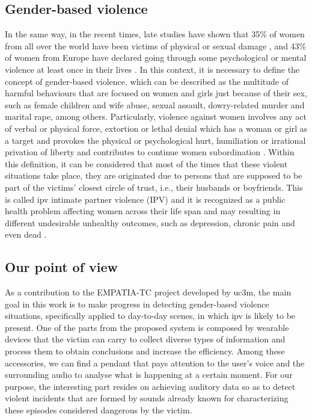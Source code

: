 \subsection{Gender-based violence}

	 In the same way, in the recent times, late studies have shown that 35\% of women from all over the world have been victims of physical or sexual damage \cite{WHO2013}, and 43\% of women from Europe have declared going through some psychological or mental violence at least once in their lives \cite{EuropeanUnionAgencyforFundamentalRights2014}. In this context, it is necessary to define the concept of gender-based violence, which can be described as the multitude of harmful behaviours that are focused on women and girls just because of their sex, such as female children and wife abuse, sexual assault, dowry-related murder and marital rape, among others. Particularly, violence against women involves any act of verbal or physical force, extortion or lethal denial which has a woman or girl as a target and provokes the physical or psychological hurt, humiliation or irrational privation of liberty and contributes to continue women subordination \cite{Heise1999}. Within this definition, it can be considered that most of the times that these violent situations take place, they are originated due to persons that are supposed to be part of the victims' closest circle of trust, i.e., their husbands or boyfriends. This is called \acrfull{ipv} intimate partner violence (IPV)  and it is recognized as a public health problem affecting women across their life span and may resulting in different undesirable unhealthy outcomes, such as depression, chronic pain and even dead \cite{Beyer2015}.
	
\subsection{Our point of view} 

	As a contribution to the EMPATIA-TC project developed by \acrlong{uc3m}, the main goal in this work is to make progress in detecting gender-based violence situations, specifically applied to day-to-day scenes, in which \acrshort{ipv} is likely to be present. One of the parts from the proposed system is composed by wearable devices that the victim can carry to collect diverse types of information and process them to obtain conclusions and increase the efficiency. Among these accessories, we can find a pendant that pays attention to the user's voice and the surrounding audio to analyse what is happening at a certain moment. For our purpose, the interesting part resides on achieving auditory data so as to detect violent incidents that are formed by sounds already known for characterizing these episodes considered dangerous by the victim.
	
